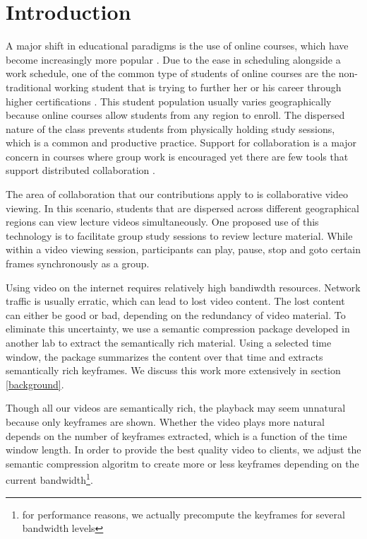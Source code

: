 \documentclass[12pt]{article}
\begin{document}
\section{Introduction} \label{sec:intro}

A major shift in educational paradigms is the use of online courses,
which have become increasingly more popular \cite{beller,doe}.  Due to
the ease in scheduling alongside a work schedule, one of the common
type of students of online courses are the non-traditional working
student that is trying to further her or his career through higher
certifications \cite{burgess:trends}.  This student population usually
varies geographically because online courses allow students from any
region to enroll.  The dispersed nature of the class prevents students
from physically holding study sessions, which is a common and
productive practice.  Support for collaboration is a major concern in
courses where group work is encouraged \cite{wells:collab} yet there
are few tools that support distributed collaboration
\cite{burgess:trends}.

The area of collaboration that our contributions apply to is
collaborative video viewing.  In this scenario, students that are
dispersed across different geographical regions can view lecture
videos simultaneously.  One proposed use of this technology is to
facilitate group study sessions to review lecture material.  While
within a video viewing session, participants can play, pause, stop and
goto certain frames synchronously as a group.

Using video on the internet requires relatively high bandiwdth
resources.  Network traffic is usually erratic, which can lead to lost
video content.  The lost content can either be good or bad, depending
on the redundancy of video material.  To eliminate this uncertainty,
we use a semantic compression package \cite{tiecheng} developed in
another lab to extract the semantically rich material.  Using a
selected time window, the package summarizes the content over that
time and extracts semantically rich keyframes.  We discuss this work
more extensively in section \ref{background}.

Though all our videos are semantically rich, the playback may seem
unnatural because only keyframes are shown.  Whether the video plays
more natural depends on the number of keyframes extracted, which is a
function of the time window length.  In order to provide the best
quality video to clients, we adjust the semantic compression algoritm
to create more or less keyframes depending on the current
bandwidth\footnote{for performance reasons, we actually precompute the
keyframes for several bandwidth levels}.
\end{document}

